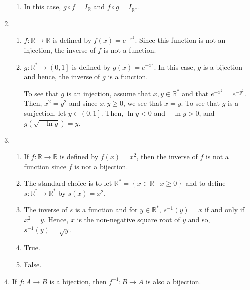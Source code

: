 \begin{enumerate}
\begin{enumerate}
\item  In this case, $g \circ f = I_{\mathbb{R}}$ and 
$f \circ g = I_{\mathbb{R}^+}$.
\end{enumerate}



\item \begin{enumerate}
\item $f:\mathbb{R} \to \mathbb{R}$ is defined by $f\left( x \right) = e^{ - x^2 } $.  Since this function is not an injection, the inverse of $f$ is not a function.

\item $g:\mathbb{R}^*  \to \left( {0, 1} \right]$ is defined by $g\left( x \right) = e^{ - x^2 }$.  In this case, $g$ is a bijection and hence, the inverse of $g$ is a function.

To see that $g$ is an injection, assume that $x, y \in \mathbb{R}^*$ and that 
$e^{-x^2} = e^{-y^2}$.  Then, $x^2 = y^2$ and since $x, y \geq 0$, we see that $x = y$.  To see that $g$ is a surjection, let $y \in \left( 0, 1 \right]$.  Then, $\ln y < 0$ and $- \ln y > 0$, and $g \left( \sqrt{-\ln y} \right) = y$.
\end{enumerate}



\item \begin{enumerate}
\item If $f:\mathbb{R} \to \mathbb{R}$ is defined by  $f\left( x \right) = x^2 $, then the inverse of $f$ is not a function since $f$ is not a bijection.

\item The standard choice is to let 
$\mathbb{R}^*  = \left\{ { {x \in \mathbb{R} } \mid x \geq 0} \right\}$ and to define 
$s: \mathbb{R}^* \to \mathbb{R}^*$ by $s \left( x \right) = x^2$.

\item The inverse of $s$ is a function and for $y \in \mathbb{R}^*$, 
$s^{-1} \left( y \right) = x$ if and only if $x^2 = y$.  Hence, $x$ is the non-negative square root of $y$ and so, $s^{-1} \left( y \right) = \sqrt y$.

\item True.  
\item False.
\end{enumerate}



\item If  $f:A \to B$ is a bijection, then  $f^{ - 1} :B \to A$ is also a bijection.


\end{enumerate}
